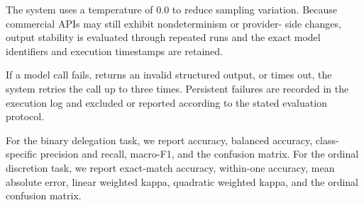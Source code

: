 %
%

The system uses a temperature of 0.0 to reduce sampling variation.
Because commercial APIs may still exhibit nondeterminism or provider-
side changes, output stability is evaluated through repeated runs and
the exact model identifiers and execution timestamps are retained.


If a model call fails, returns an invalid structured output, or times
out, the system retries the call up to three times. Persistent failures
are recorded in the execution log and excluded or reported according to
the stated evaluation protocol.



%

For the binary delegation task, we report accuracy, balanced accuracy,
class-specific precision and recall, macro-F1, and the confusion matrix.
For the ordinal discretion task, we report exact-match accuracy,
within-one accuracy, mean absolute error, linear weighted kappa,
quadratic weighted kappa, and the ordinal confusion matrix.



